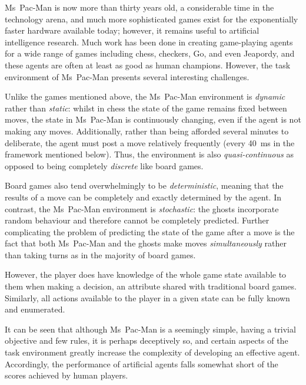 Ms~Pac-Man is now more than thirty years old, a considerable time in the technology arena, and much more sophisticated games exist for the exponentially faster hardware available today; however, it remains useful to artificial intelligence research.  Much work has been done in creating game-playing agents for a wide range of games including chess, checkers, Go, and even Jeapordy, and these agents are often at least as good as human champions.  However, the task environment  of Ms~Pac-Man presents several interesting challenges.

Unlike the games mentioned above, the Ms~Pac-Man environment is \emph{dynamic} rather than \emph{static}: whilst in chess the state of the game remains fixed between moves, the state in Ms~Pac-Man is continuously changing, even if the agent is not making any moves.  Additionally, rather than being afforded several minutes to deliberate, the agent must post a move relatively frequently (every 40~ms in the framework mentioned below).  Thus, the environment is also \emph{quasi-continuous} as opposed to being completely \emph{discrete} like board games.

Board games also tend overwhelmingly to be \emph{deterministic}, meaning that the results of a move can be completely and exactly determined by the agent.  In contrast, the Ms~Pac-Man environment is \emph{stochastic}: the ghosts incorporate random behaviour and therefore cannot be completely predicted.  Further complicating the problem of predicting the state of the game after a move is the fact that both Ms~Pac-Man and the ghosts make moves \emph{simultaneously} rather than taking turns as in the majority of board games.

However, the player does have knowledge of the whole game state available to them when making a decision, an attribute shared with traditional board games.  Similarly, all actions available to the player in a given state can be fully known and enumerated.

It can be seen that although Ms~Pac-Man is a seemingly simple, having a trivial objective and few rules, it is perhaps deceptively so, and certain aspects of the task environment greatly increase the complexity of developing an effective agent.  Accordingly, the performance of artificial agents falls somewhat short of the scores achieved by human players.

